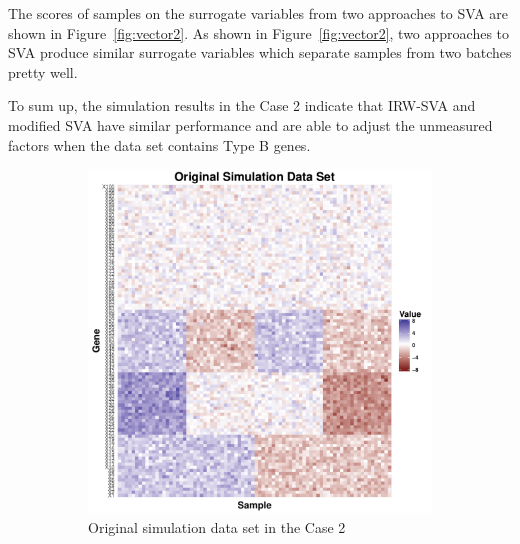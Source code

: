 \documentclass[11pt]{article}
\begin{document}
The scores of samples on the surrogate variables from two approaches to SVA are shown in Figure~\ref{fig:vector2}. As shown in Figure~\ref{fig:vector2}, two approaches to SVA produce similar surrogate variables which separate samples from two batches pretty well.

To sum up, the simulation results in the Case 2 indicate that IRW-SVA and modified SVA have similar performance and are able to adjust the unmeasured factors when the data set contains Type B genes.

\begin{figure}[h!]
    \centering
    \begin{subfigure}[b]{0.31\textwidth}
        \centering
        \includegraphics[width = \textwidth]{figures/simulate2.pdf}
        \caption{Original simulation data set in the Case 2}
        \label{fig:data2}
    \end{subfigure}%
~
    \begin{subfigure}[b]{0.31\textwidth}
        \centering

\end{subfigure}
\end{figure}
\end{document}
